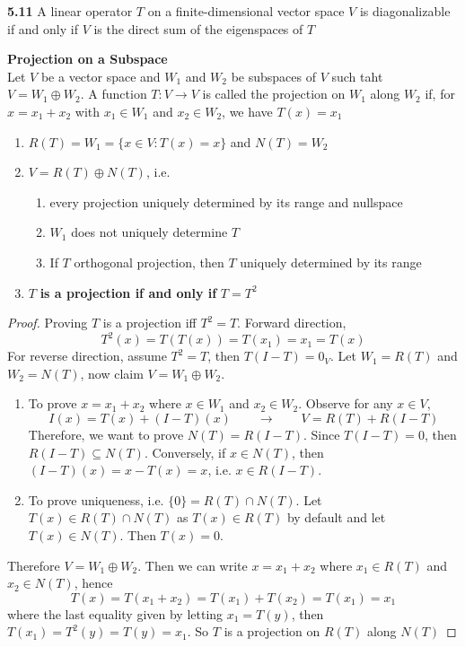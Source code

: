 \documentclass[11pt]{article}
\begin{document}
\begin{theorem*}
    \textbf{5.11} A linear operator $T$ on a finite-dimensional vector space $V$ is diagonalizable if and only if $V$ is the direct sum of the eigenspaces of $T$
\end{theorem*}



\begin{defn*}
    \textbf{Projection on a Subspace} \\
    Let $V$ be a vector space and $W_1$ and $W_2$ be subspaces of $V$ such taht $V = W_1 \oplus W_2$. A function $T:V\to V$ is called the projection on $W_1$ along $W_2$ if, for $x = x_1 + x_2$ with $x_1 \in W_1$ and $x_2\in W_2$, we have $T(x) = x_1$
    \begin{enumerate}
        \item $R(T) = W_1 = \{ x\in V: T(x) = x \}$ and $N(T) = W_2$
        \item $V = R(T) \oplus N(T)$, i.e. 
        \begin{enumerate}
            \item every projection uniquely determined by its range and nullspace
            \item $W_1$ does not uniquely determine $T$
            \item If $T$ orthogonal projection, then $T$ uniquely determined by its range
        \end{enumerate}
        \item $T$ \textbf{is a projection if and only if} $T = T^2$
    \end{enumerate}
    \begin{proof}
        Proving $T$ is a projection iff $T^2 = T$. Forward direction, 
        \[
            T^2(x) = T(T(x)) = T(x_1) = x_1 = T(x)
        \]
        For reverse direction, assume $T^2 = T$, then $T(I-T) = 0_V$. Let $W_1 = R(T)$ and $W_2 = N(T)$, now claim $V = W_1 \oplus W_2$. 
        \begin{enumerate}
            \item To prove $x = x_1 + x_2$ where $x\in W_1$ and $x_2\in W_2$. Observe for any $x\in V$, 
            \[
                I(x) = T(x) + (I-T)(x) 
                \qquad \longrightarrow \qquad 
                V = R(T) + R(I-T)
            \]
            Therefore, we want to prove $N(T) = R(I-T)$. Since $T(I-T)=0$, then $R(I-T)\subseteq N(T)$. Conversely, if $x\in N(T)$, then $(I-T)(x) = x - T(x) = x$, i.e. $x\in R(I-T)$. 
            \item To prove uniqueness, i.e. $\{ 0\} = R(T) \cap N(T)$. Let $T(x) \in R(T) \cap N(T)$ as $T(x)\in R(T)$ by default and let $T(x)\in N(T)$. Then $T(x) = 0$. 
        \end{enumerate}
        Therefore $V = W_1 \oplus W_2$. Then we can write $x = x_1 + x_2$ where $x_1 \in R(T)$ and $x_2 \in N(T)$, hence 
        \[
            T(x) = T(x_1 + x_2) = T(x_1) + T(x_2) = T(x_1) = x_1
        \]
        where the last equality given by letting $x_1 = T(y)$, then $T(x_1) = T^2(y) = T(y)=  x_1$. So $T$ is a projection on $R(T)$ along $N(T)$
    \end{proof}
\end{defn*}
\end{document}

